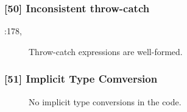 \subsubsection{[50] Inconsistent throw-catch}
\begin{description}
	\item[:178, ] Throw-catch expressions are well-formed. %
\end{description}
\subsubsection{[51] Implicit Type Comversion}
\begin{description}
	\item[] No implicit type conversions in the code. %
\end{description}
